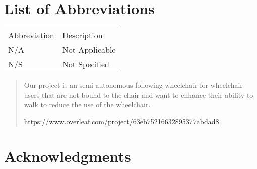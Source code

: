 \documentclass[showtrims]{rubook}
\begin{document}
\chapter*{List of Abbreviations}%
\begin{tabular}{ll}
Abbreviation &Description \\
N/A & Not Applicable \\ %
N/S & Not Specified \\ %
\end{tabular}
\begin{abstract}
    Our project is an semi-autonomous following wheelchair for wheelchair users that are not bound to the chair and want to enhance their ability to walk to reduce the use of the wheelchair.
    
    \newline
    \url{https://www.overleaf.com/project/63eb75216632895377abdad8}

  

\end{abstract}


\chapter*{Acknowledgments} 
\end{document}
